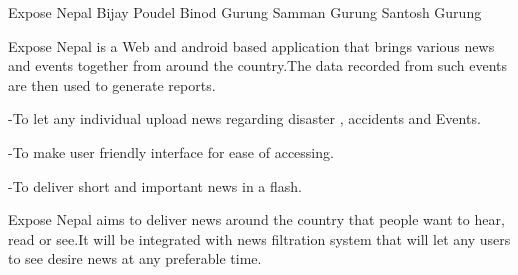 \begin{conf-abstract}[]
 {Expose Nepal }
 {Bijay Poudel
 	Binod Gurung
 	Samman Gurung
 	Santosh Gurung
 }
{}

Expose Nepal is a Web and android based application that brings various news and events together from around the country.The data recorded from such events are then used to generate reports.


-To let any individual upload news regarding disaster , accidents and Events.

-To make user friendly interface for ease of accessing.

-To deliver short and important news in a flash.


Expose Nepal aims to deliver news around the country that people want to hear, read or see.It will be integrated with news filtration system that will let any users to see desire news at any preferable time.

 \end{conf-abstract}